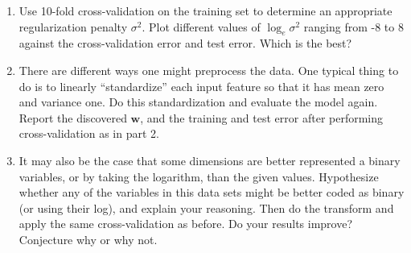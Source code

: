 \documentclass{harvardml}
\newcommand{\bw}{\mathbf{w}}
\begin{document}
\begin{problem}
\begin{enumerate}
  \item Use
    10-fold cross-validation on the training set to determine an appropriate regularization
    penalty $\sigma^2$.  Plot different values of $\log_e \sigma^2$ ranging from -8 to 8  against the cross-validation error and test error.  Which is the best?
  \item There are different ways one might preprocess the data.  One
    typical thing to do is to linearly ``standardize'' each input feature so
    that it has mean zero and variance one.  Do this standardization
    and evaluate the model again.  Report the discovered $\bw$, and the training and test error after performing cross-validation as in part 2.
    \item It may also be the case that some dimensions are better represented a binary variables, or by taking the logarithm, than the given values.
  Hypothesize whether any of the variables in this data sets might be better coded as binary (or using their log), and explain your reasoning.
  Then do the transform and apply the same cross-validation as before.  Do your results improve?  Conjecture why or why not.
\end{enumerate}

\end{problem}
\end{document}
